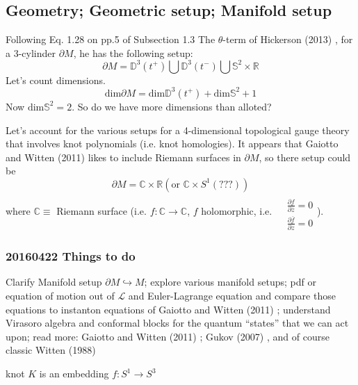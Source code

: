 \documentclass[10pt]{amsart}
\begin{document}
\begin{multicols}{2}
\subsection{Geometry; Geometric setup; Manifold setup}

Following Eq. 1.28 on pp.5 of Subsection 1.3 The $\theta$-term of Hickerson (2013) \cite{Hick2013}, for a 3-cylinder $\partial M$, he has the following setup:
\[
\partial M = \mathbb{D}^3(t^+) \bigcup \mathbb{D}^3(t^-) \bigcup \mathbb{S}^2 \times \mathbb{R}
\]
Let's count dimensions.  
\[
\text{dim} \partial M  = \text{dim} \mathbb{D}^3(t^+) + \text{dim}\mathbb{S}^2 + 1 
\]
Now $\text{dim}\mathbb{S}^2 =2$.  So do we have more dimensions than alloted?  

Let's account for the various setups for a 4-dimensional topological gauge theory that involves knot polynomials (i.e. knot homologies).  It appears that Gaiotto and Witten (2011) \cite{GW2011} likes to include Riemann surfaces in $\partial M$, so there setup could be
\[
\partial M = \mathbb{C} \times \mathbb{R} (\text{or } \mathbb{C}\times S^1 (???) )
\]
where $\mathbb{C} \equiv $ Riemann surface (i.e. $f:\mathbb{C} \to \mathbb{C}$, $f$ holomorphic, i.e. $\begin{aligned} & \quad \\
  & \frac{ \partial f}{ \partial \overline{z}} = 0 \\
  & \frac{ \partial \overline{f}}{ \partial z } = 0 \end{aligned}$).  

\subsubsection{20160422 Things to do}

Clarify Manifold setup $\partial M \hookrightarrow M$; explore various manifold setups; pdf or equation of motion out of $\mathcal{L}$ and Euler-Lagrange equation and compare those equations to instanton equations of Gaiotto and Witten (2011) \cite{GW2011}; understand Virasoro algebra and conformal blocks for the quantum ``states'' that we can act upon; read more: Gaiotto and Witten (2011) \cite{GW2011}; Gukov (2007) \cite{Guko2007}, and of course classic Witten (1988) \cite{Witten:1988hf}


knot $K$ is an embedding $f: S^1 \to S^3$




\end{multicols}
\end{document}
